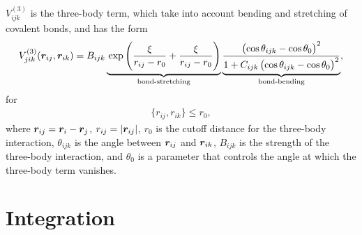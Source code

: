 $V_{ijk}^{(3)}$ is the three-body term, which take into account bending and stretching of covalent bonds, and has the form
\begin{align*}
    V^{(3)}_{jik}(\rvec_{ij}, \rvec_{ik}) = 
    B_{ijk} 
    \underbrace{ %
        \vphantom{\frac{\big)^2}{\big)^2}}\exp\left( \frac{\xi}{r_{ij} - r_0} + \frac{\xi}{r_{ij} - r_0} \right)
    }_{\text{bond-stretching}}
    \underbrace{
        \frac{\left(\cos\theta_{ijk} - \cos\theta_0\right)^2}{1 + C_{ijk}\left(\cos\theta_{ijk} - \cos\theta_0\right)^2}
    }_{\text{bond-bending}}
    ,
\end{align*}
for
\begin{align*}
    \{r_{ij}, r_{ik}\} \leq r_0,
\end{align*}
where $\boldsymbol{r}_{ij} = \boldsymbol{r}_i - \boldsymbol{r}_j$, $r_{ij} = |\boldsymbol{r}_{ij}|$, $r_0$ is the cutoff distance for the three-body interaction, $\theta_{ijk}$ is the angle between $\boldsymbol{r}_{ij}$ and $\boldsymbol{r}_{ik}$, $B_{ijk}$ is the strength of the three-body interaction, and $\theta_0$ is a parameter that controls the angle at which the three-body term vanishes.

\section{Integration}


